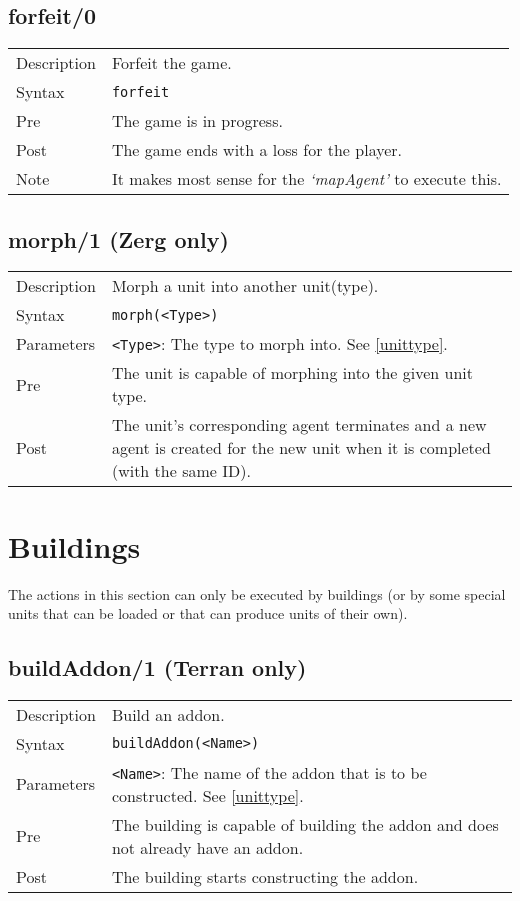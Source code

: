 \subsection{forfeit/0}
\begin{tabularx}{\textwidth}{lX}
 Description & Forfeit the game. \\
 Syntax & \verb|forfeit| \\
 Pre & The game is in progress. \\
 Post & The game ends with a loss for the player. \\
 Note & It makes most sense for the \textit{`mapAgent'} to execute this.
\end{tabularx}

\subsection{morph/1 (Zerg only)}
\begin{tabularx}{\textwidth}{lX}
 Description & Morph a unit into another unit(type). \\
 Syntax & \verb|morph(<Type>)| \\
 Parameters & \verb|<Type>|: The type to morph into. See \ref{unittype}. \\
 Pre & The unit is capable of morphing into the given unit type. \\
 Post & The unit's corresponding agent terminates and a new agent is created for the new unit when it is completed (with the same ID).
\end{tabularx}

\newpage

\section{Buildings}
The actions in this section can only be executed by buildings (or by some special units that can be loaded or that can produce units of their own).

\subsection{buildAddon/1 (Terran only)}
\begin{tabularx}{\textwidth}{lX}
 Description & Build an addon. \\
 Syntax & \verb|buildAddon(<Name>)| \\
 Parameters & \verb|<Name>|: The name of the addon that is to be constructed. See \ref{unittype}. \\
 Pre & The building is capable of building the addon and does not already have an addon. \\
 Post & The building starts constructing the addon.
\end{tabularx}


